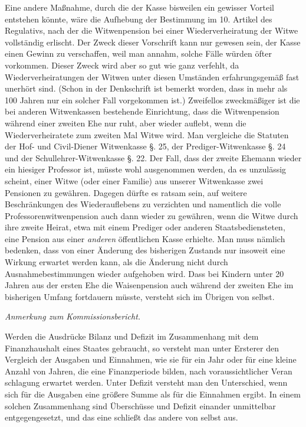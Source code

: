 Eine andere Maßnahme, durch die der Kasse bisweilen ein gewisser Vorteil entstehen könnte, wäre die Aufhebung der Bestimmung im 10. Artikel des Regulativs, nach der die Witwenpension bei einer Wiederverheiratung der Witwe vollständig erlischt. Der Zweck dieser Vorschrift kann nur gewesen sein, der Kasse einen Gewinn zu verschaffen, weil man annahm, solche Fälle würden öfter vorkommen. Dieser Zweck wird aber so gut wie ganz verfehlt, da Wiederverheiratungen der Witwen unter diesen Umständen erfahrungsgemäß fast unerhört sind. (Schon in der Denkschrift ist bemerkt worden, dass in mehr als 100 Jahren nur ein solcher Fall vorgekommen ist.) Zweifellos zweckmäßiger ist die bei anderen Witwenkassen bestehende Einrichtung, dass die Witwenpension während einer zweiten Ehe nur ruht, aber wieder auflebt, wenn die Wiederverheiratete zum zweiten Mal Witwe wird. Man vergleiche die Statuten der Hof- und Civil-Diener Witwenkasse §. 25, der Prediger-Witwenkasse §. 24 und der Schullehrer-Witwenkasse §. 22. Der Fall, dass der zweite Ehemann wieder ein hiesiger Professor ist, müsste wohl ausgenommen werden, da es unzulässig scheint, einer Witwe (oder einer Familie) aus unserer Witwenkasse zwei Pensionen zu gewähren. Dagegen dürfte es ratsam sein, auf weitere Beschränkungen des Wiederauflebens zu verzichten und namentlich die volle Professorenwitwenpension auch dann wieder zu gewähren, wenn die Witwe durch ihre zweite Heirat, etwa mit einem Prediger oder anderen Staatsbediensteten, eine Pension aus einer \textit{anderen} öffentlichen Kasse erhielte. Man muss nämlich bedenken, dass von einer Änderung des bisherigen Zustands nur insoweit eine Wirkung erwartet werden kann, als die Änderung nicht durch Ausnahmebestimmungen wieder aufgehoben wird. Dass bei Kindern unter 20 Jahren aus der ersten Ehe die Waisenpension auch während der zweiten Ehe im bisherigen Umfang fortdauern müsste, versteht sich im Übrigen von selbst.

\begin{center}\textit{Anmerkung zum Kommissionsbericht.}\end{center}
\noindent\hspace*{\parindent}Werden die Ausdrücke Bilanz und Defizit im Zusammenhang mit dem Finanzhaushalt eines Staates gebraucht, so versteht man unter Ersterer den Vergleich der Ausgaben und Einnahmen, wie sie für ein Jahr oder für eine kleine Anzahl von Jahren, die eine Finanzperiode bilden, nach voraussichtlicher Veran%
schlagung erwartet werden. Unter Defizit versteht man den Unterschied, wenn sich für die Ausgaben eine größere Summe als für die Einnahmen ergibt. In einem solchen Zusammenhang sind Überschüsse und Defizit einander unmittelbar entgegengesetzt, und das eine schließt das andere von selbst aus.


